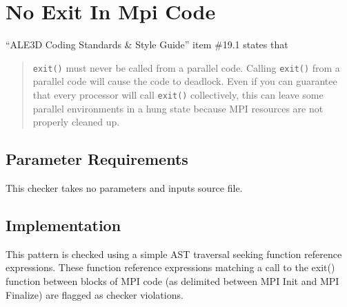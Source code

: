 %
%

\section{No Exit In Mpi Code}
\label{NoExitInMpiCode::overview}

``ALE3D Coding Standards \& Style Guide'' item \#19.1 states that
\begin{quote}
{\tt exit()} must never be called from a parallel code. Calling {\tt exit()} from a parallel code will cause the code to deadlock. Even if you can guarantee that every processor will call {\tt exit()} collectively, this can leave some parallel environments in a hung state because MPI resources are not properly cleaned up. 
\end{quote}

\subsection{Parameter Requirements}
This checker takes no parameters and inputs source file.

\subsection{Implementation}
This pattern is checked using a simple AST traversal seeking function reference
expressions. These function reference expressions matching a call to the exit()
function between blocks of MPI code (as delimited between MPI Init and MPI
Finalize) are flagged as checker violations.

